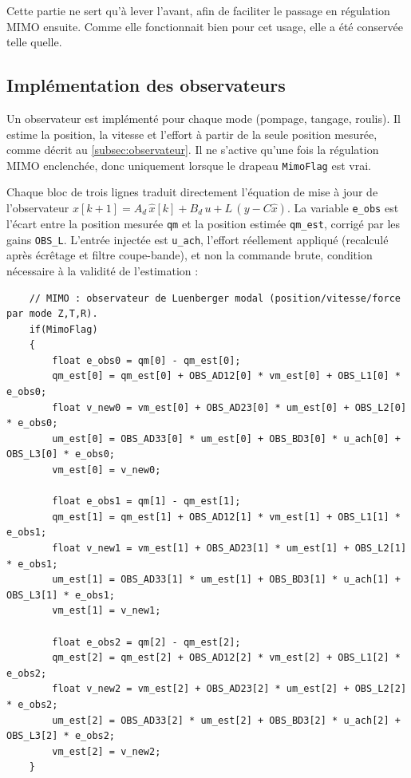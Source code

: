 Cette partie ne sert qu'à lever l'avant, afin de faciliter le passage en régulation MIMO ensuite. Comme elle fonctionnait bien pour cet usage, elle a été conservée telle quelle.

\subsection{Implémentation des observateurs}
Un observateur est implémenté pour chaque mode (pompage, tangage, roulis). Il estime la position, la vitesse et l'effort à partir de la seule position mesurée, comme décrit au \autoref{subsec:observateur}. Il ne s'active qu'une fois la régulation MIMO enclenchée, donc uniquement lorsque le drapeau \texttt{MimoFlag} est vrai.

Chaque bloc de trois lignes traduit directement l'équation de mise à jour de l'observateur $\hat{x}[k+1] = A_d\,\hat{x}[k] + B_d\,u + L\,(y - C\hat{x})$. La variable \texttt{e\_obs} est l'écart entre la position mesurée \texttt{qm} et la position estimée \texttt{qm\_est}, corrigé par les gains \texttt{OBS\_L}. L'entrée injectée est \texttt{u\_ach}, l'effort réellement appliqué (recalculé après écrêtage et filtre coupe-bande), et non la commande brute, condition nécessaire à la validité de l'estimation :

\begin{verbatim}
    // MIMO : observateur de Luenberger modal (position/vitesse/force par mode Z,T,R).
    if(MimoFlag)
    {
        float e_obs0 = qm[0] - qm_est[0];
        qm_est[0] = qm_est[0] + OBS_AD12[0] * vm_est[0] + OBS_L1[0] * e_obs0;
        float v_new0 = vm_est[0] + OBS_AD23[0] * um_est[0] + OBS_L2[0] * e_obs0;
        um_est[0] = OBS_AD33[0] * um_est[0] + OBS_BD3[0] * u_ach[0] + OBS_L3[0] * e_obs0;
        vm_est[0] = v_new0;

        float e_obs1 = qm[1] - qm_est[1];
        qm_est[1] = qm_est[1] + OBS_AD12[1] * vm_est[1] + OBS_L1[1] * e_obs1;
        float v_new1 = vm_est[1] + OBS_AD23[1] * um_est[1] + OBS_L2[1] * e_obs1;
        um_est[1] = OBS_AD33[1] * um_est[1] + OBS_BD3[1] * u_ach[1] + OBS_L3[1] * e_obs1;
        vm_est[1] = v_new1;

        float e_obs2 = qm[2] - qm_est[2];
        qm_est[2] = qm_est[2] + OBS_AD12[2] * vm_est[2] + OBS_L1[2] * e_obs2;
        float v_new2 = vm_est[2] + OBS_AD23[2] * um_est[2] + OBS_L2[2] * e_obs2;
        um_est[2] = OBS_AD33[2] * um_est[2] + OBS_BD3[2] * u_ach[2] + OBS_L3[2] * e_obs2;
        vm_est[2] = v_new2;
    }
\end{verbatim}

